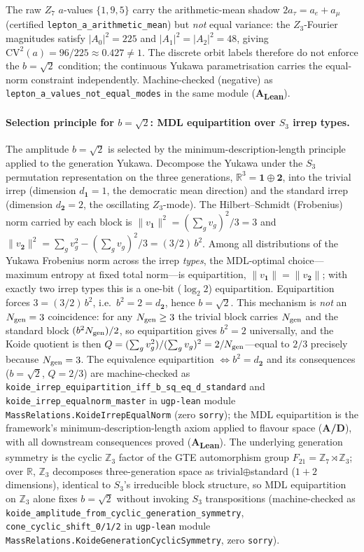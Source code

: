 \documentclass[11pt]{article}
\newcommand{\CatAL}{\textbf{A\textsubscript{Lean}}}
\newcommand{\CatAD}{\textbf{A/D}}
\theoremstyle{remark}
\begin{document}
The raw $Z_7$ $a$-values $\{1,9,5\}$ carry the arithmetic-mean shadow $2a_\tau = a_e + a_\mu$ (certified \texttt{lepton\_a\_arithmetic\_mean}) but \emph{not} equal variance: the $Z_3$-Fourier magnitudes satisfy $|A_0|^2 = 225$ and $|A_1|^2 = |A_2|^2 = 48$, giving $\mathrm{CV}^2(a) = 96/225 \approx 0.427 \neq 1$.  The discrete orbit labels therefore do not enforce the $b = \sqrt{2}$ condition; the continuous Yukawa parametrisation carries the equal-norm constraint independently.  Machine-checked (negative) as \texttt{lepton\_a\_values\_not\_equal\_modes} in the same module (\CatAL).

\paragraph{Selection principle for $b=\sqrt{2}$: MDL equipartition over $S_3$ irrep types.}
The amplitude $b=\sqrt{2}$ is selected by the minimum-description-length principle applied to the generation Yukawa.  Decompose the Yukawa under the $S_3$ permutation representation on the three generations, $\mathbb{R}^3 = \mathbf{1}\oplus\mathbf{2}$, into the trivial irrep (dimension $d_{\mathbf 1}=1$, the democratic mean direction) and the standard irrep (dimension $d_{\mathbf 2}=2$, the oscillating $Z_3$-mode).  The Hilbert--Schmidt (Frobenius) norm carried by each block is $\|v_{\mathbf 1}\|^2 = (\sum_g v_g)^2/3 = 3$ and $\|v_{\mathbf 2}\|^2 = \sum_g v_g^2 - (\sum_g v_g)^2/3 = (3/2)\,b^2$.  Among all distributions of the Yukawa Frobenius norm across the irrep \emph{types}, the MDL-optimal choice---maximum entropy at fixed total norm---is equipartition, $\|v_{\mathbf 1}\| = \|v_{\mathbf 2}\|$; with exactly two irrep types this is a one-bit ($\log_2 2$) equipartition.  Equipartition forces $3 = (3/2)\,b^2$, i.e.\ $b^2 = 2 = d_{\mathbf 2}$, hence $b=\sqrt{2}$.  This mechanism is \emph{not} an $N_{\rm gen}=3$ coincidence: for any $N_{\rm gen}\ge 3$ the trivial block carries $N_{\rm gen}$ and the standard block $(b^2 N_{\rm gen})/2$, so equipartition gives $b^2 = 2$ universally, and the Koide quotient is then $Q = (\sum_g v_g^2)/(\sum_g v_g)^2 = 2/N_{\rm gen}$---equal to $2/3$ precisely because $N_{\rm gen} = 3$.  The equivalence equipartition $\Leftrightarrow b^2 = d_{\mathbf 2}$ and its consequences ($b=\sqrt{2}$, $Q=2/3$) are machine-checked as \texttt{koide\_irrep\_equipartition\_iff\_b\_sq\_eq\_d\_standard} and \texttt{koide\_irrep\_equalnorm\_master} in \texttt{ugp-lean} module \texttt{MassRelations.KoideIrrepEqualNorm} (zero \texttt{sorry}); the MDL equipartition is the framework's minimum-description-length axiom applied to flavour space (\CatAD), with all downstream consequences proved (\CatAL).  The underlying generation symmetry is the cyclic $\mathbb{Z}_3$ factor of the GTE automorphism group $F_{21}=\mathbb{Z}_7\rtimes\mathbb{Z}_3$; over $\mathbb{R}$, $\mathbb{Z}_3$ decomposes three-generation space as trivial$\oplus$standard ($1+2$ dimensions), identical to $S_3$'s irreducible block structure, so MDL equipartition on $\mathbb{Z}_3$ alone fixes $b=\sqrt{2}$ without invoking $S_3$ transpositions (machine-checked as \texttt{koide\_amplitude\_from\_cyclic\_generation\_symmetry}, \texttt{cone\_cyclic\_shift\_0/1/2} in \texttt{ugp-lean} module \texttt{MassRelations.KoideGenerationCyclicSymmetry}, zero \texttt{sorry}).
\end{document}
